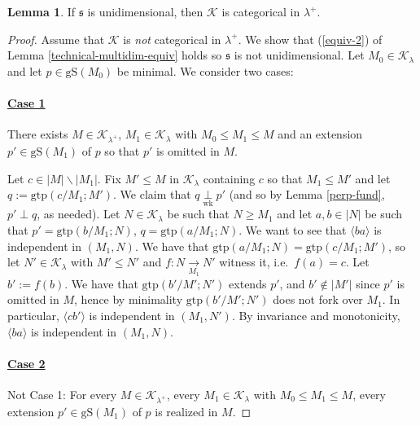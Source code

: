 \documentclass[12pt]{amsart}
\theoremstyle{definition}
\newtheorem{lem}[mydef]{Lemma}
\begin{document}
\begin{lem}\label{unidim-categ-0}
  If ${\mathfrak{s}}$ is unidimensional, then ${\mathcal{K}}$ is categorical in $\lambda^+$.
\end{lem}
\begin{proof}
  Assume that ${\mathcal{K}}$ is \emph{not} categorical in $\lambda^+$. We show that (\ref{equiv-2}) of Lemma \ref{technical-multidim-equiv} holds so ${\mathfrak{s}}$ is not unidimensional. Let $M_0 \in {\mathcal{K}}_\lambda$ and let $p \in {\text{gS}} (M_0)$ be minimal. We consider two cases:

  \paragraph{\underline{Case 1}} There exists $M \in {\mathcal{K}}_{\lambda^+}$, $M_1 \in {\mathcal{K}}_{\lambda}$ with $M_0 {\le} M_1 {\le} M$ and an extension $p' \in {\text{gS}} (M_1)$ of $p$ so that $p'$ is omitted in $M$.

  Let $c \in |M| \backslash |M_1|$. Fix $M' {\le} M$ in ${\mathcal{K}}_\lambda$ containing $c$ so that $M_1 {\le} M'$ and let $q := {\text{gtp}} (c / M_1; M')$. We claim that $q {{{{\underset{{{\text{wk}}}}{\overset{{{{}}}}{{\perp}}}}}}} p'$ (and so by Lemma \ref{perp-fund}, $p' \perp q$, as needed). Let $N \in {\mathcal{K}}_\lambda$ be such that $N {\ge} M_1$ and let $a, b \in |N|$ be such that $p' = {\text{gtp}} (b / M_1; N)$, $q = {\text{gtp}} (a / M_1; N)$. We want to see that ${\langle {ba} \rangle}$ is independent in $(M_1, N)$. We have that ${\text{gtp}} (a / M_1; N) = {\text{gtp}} (c / M_1; M')$, so let $N' \in {\mathcal{K}}_\lambda$ with $M' {\le} N'$ and $f: N \xrightarrow[M_1]{} N'$ witness it, i.e.\ $f (a) = c$. Let $b' := f (b)$. We have that ${\text{gtp}} (b' / M'; N')$ extends $p'$, and $b' \notin |M'|$ since $p'$ is omitted in $M$, hence by minimality ${\text{gtp}} (b' /M'; N')$ does not fork over $M_1$. In particular, ${\langle {c b'} \rangle}$ is independent in $(M_1, N')$. By invariance and monotonicity, ${\langle {b a} \rangle}$ is independent in $(M_1, N)$.

  \paragraph{\underline{Case 2}} Not Case 1: For every $M \in {\mathcal{K}}_{\lambda^+}$, every $M_1 \in {\mathcal{K}}_{\lambda}$ with $M_0 {\le} M_1 {\le} M$, every extension $p' \in {\text{gS}} (M_1)$ of $p$ is realized in $M$.


\end{proof}
\end{document}
